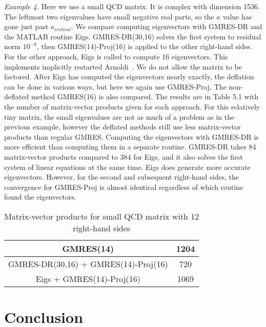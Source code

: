 \documentclass[final]{siamltex}
\begin{document}
{\it Example 4.}  
Here we use a small QCD matrix.  It is complex with dimension 1536.  The leftmost two eigenvalues have small negative real parts, so the $\kappa$ value has gone just past $\kappa_{critical}$.  We compare computing eigenvectors with GMRES-DR and the MATLAB routine Eigs.  GMRES-DR(30,16) solves the first system to residual norm $10^{-8}$, then GMRES(14)-Proj(16) is applied to the other right-hand sides.   For the other approach, Eigs is called to compute 16 eigenvectors.  This implements implicitly restarted Arnoldi~\cite{So}.  We do not allow the matrix to be factored.  After Eigs has computed the eigenvectors nearly exactly, the deflation can be done in various ways, but here we again use GMRES-Proj.  The non-deflated method GMRES(16) is also compared.  The results are in Table 5.1 with the number of matrix-vector products given for each approach.  For this relatively tiny matrix, the small eigenvalues are not as much of a problem as in the previous example, however the deflated methods still use less matrix-vector products than regular GMRES.  Computing the eigenvectors with GMRES-DR is more efficient than computing them in a separate routine.  GMRES-DR takes 84 matrix-vector products compared to 384 for Eigs, and it also solves the first system of linear equations at the same time.  Eigs does generate more accurate eigenvectors.  However, for the second and subsequent right-hand sides, the convergence for GMRES-Proj is almost identical regardless of which routine found the eigenvectors.

\begin{table}
\caption{Matrix-vector products for small QCD matrix with 12 right-hand sides} 

\begin{center} \footnotesize
\begin{tabular}{|c|c|}  \hline\hline
GMRES(14)         					& 1204   	\\ \hline
GMRES-DR(30,16) + GMRES(14)-Proj(16)        	& 720   	\\ \hline
Eigs + GMRES(14)-Proj(16)         		    	& 1069   	\\ \hline 

\hline\hline 

\end{tabular} 
\end{center} 
\end{table} 

\section{Conclusion}
\end{document}
